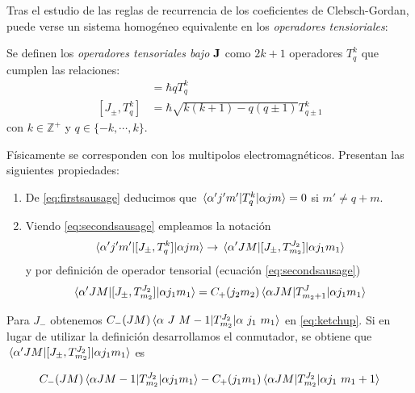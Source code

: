 Tras el estudio de las reglas de recurrencia de los coeficientes de
Clebsch-Gordan, puede verse un sistema homogéneo equivalente en los
\emph{operadores tensioriales}:

\begin{mydef*}
  Se definen los \emph{operadores tensoriales bajo $\bm{\mathrm{J}}$} como
  $2k+1$ operadores $T_q^k$ que cumplen las relaciones:
  \begin{align}
    [J_z,T_q^k] &= \hbar q T_q^k \label{eq:firstsausage}\\
    [J_{\pm},T_q^k] &=  \hbar \sqrt{k(k+1)-q(q\pm1)} T_{q\pm1}^k \label{eq:secondsausage}
  \end{align}
  con $k\in \mathbb{Z}^+$ y $q \in \{-k,\cdots,k\}$.
\end{mydef*}

Físicamente se corresponden con los multipolos electromagnéticos.
Presentan las siguientes propiedades:
\begin{enumerate}
\item De \eqref{eq:firstsausage} deducimos que
$\mel{\alpha'j'm'}{T_q^k}{\alpha jm}=0$ si $m'\neq q+m$. 
\item Viendo \eqref{eq:secondsausage} empleamos la notación
\begin{equation}
  \begin{split}
    \mel{\alpha'j'm'}{[J_\pm,T_q^k]}{\alpha j m}  \to  \mel{\alpha'JM}{[J_\pm,T_{m_2}^{J_2}]}{\alpha j_1 m_1}
  \end{split}
\end{equation}
y por definición de operador tensorial (ecuación \eqref{eq:secondsausage})
\begin{equation}
  \begin{split}
    \mel{\alpha'JM}{[J_\pm,T_{m_2}^{J_2}]}{\alpha j_1 m_1} = C_+ (j_2 m_2)
    \mel{\alpha J M}{T_{m_2+1}^J}{\alpha j_1 m_1}
  \end{split}
  \label{eq:ketchup}
\end{equation}
\end{enumerate}

Para $J_-$ obtenemos $C_- (JM)
\mel{\alpha \ J\  M-1}{T_{m_2}^{J_2}}{\alpha \ j_1\ m_1}
$ en \eqref{eq:ketchup}. Si en lugar de utilizar la definición
desarrollamos el conmutador, se obtiene que
$\mel{\alpha'JM}{[J_\pm,T_{m_2}^{J_2}]}{\alpha j_1 m_1}$ es

\begin{equation}
C_- (JM)
    \mel{\alpha J M-1}{T_{m_2}^{J_2}}{\alpha j_1 m_1} - C_+ (j_1 m_1)
    \mel{\alpha J M}{T_{m_2}^{J_2}}{\alpha j_1 \ m_1+1}
    \label{eq:mrrobot}
\end{equation}

